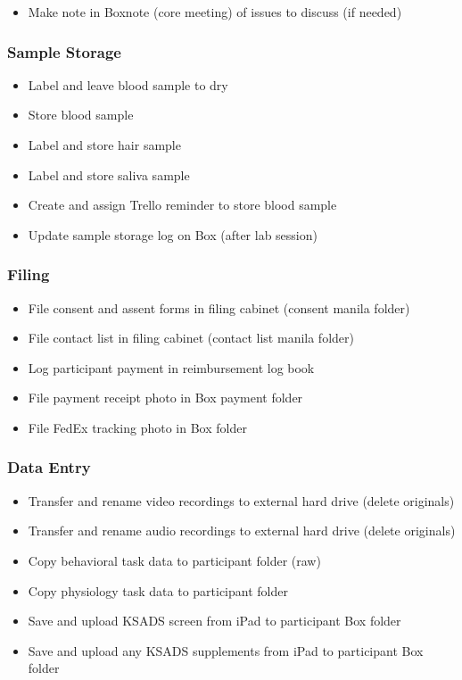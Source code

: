 \documentclass[]{book}
\providecommand{\tightlist}{%
  \setlength{\itemsep}{0pt}\setlength{\parskip}{0pt}}
\begin{document}
\begin{itemize}
\tightlist
\item
  Make note in Boxnote (core meeting) of issues to discuss (if needed)
\end{itemize}

\hypertarget{sample-storage}{%
\subsubsection{Sample Storage}\label{sample-storage}}

\begin{itemize}
\tightlist
\item
  Label and leave blood sample to dry
\item
  Store blood sample
\item
  Label and store hair sample
\item
  Label and store saliva sample
\item
  Create and assign Trello reminder to store blood sample
\item
  Update sample storage log on Box (after lab session)
\end{itemize}

\hypertarget{filing}{%
\subsubsection{Filing}\label{filing}}

\begin{itemize}
\tightlist
\item
  File consent and assent forms in filing cabinet (consent manila folder)
\item
  File contact list in filing cabinet (contact list manila folder)
\item
  Log participant payment in reimbursement log book
\item
  File payment receipt photo in Box payment folder
\item
  File FedEx tracking photo in Box folder
\end{itemize}

\hypertarget{data-entry}{%
\subsubsection{Data Entry}\label{data-entry}}

\begin{itemize}
\tightlist
\item
  Transfer and rename video recordings to external hard drive (delete originals)
\item
  Transfer and rename audio recordings to external hard drive (delete originals)
\item
  Copy behavioral task data to participant folder (raw)
\item
  Copy physiology task data to participant folder
\item
  Save and upload KSADS screen from iPad to participant Box folder
\item
  Save and upload any KSADS supplements from iPad to participant Box folder
\end{itemize}
\end{document}
